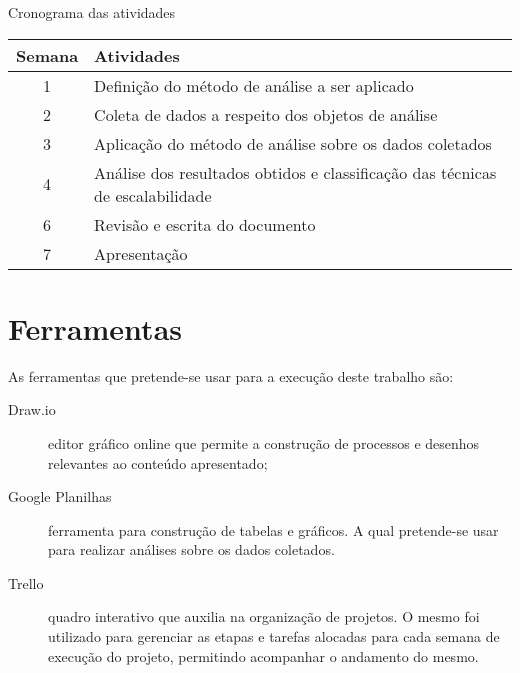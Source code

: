 \begin{quadro}
    \caption{Cronograma das atividades\label{quad:Cronograma}}
    \begin{tabular}{ | c | l | }
    \hline
    \textbf{Semana} &
        \textbf{Atividades} \\ \hline
        1 & Definição do método de análise a ser aplicado \\ \hline
        2 & Coleta de dados a respeito dos objetos de análise \\ \hline
        3 & Aplicação do método de análise sobre os dados coletados \\ \hline
        4 & Análise dos resultados obtidos e classificação das técnicas de escalabilidade \\ \hline
        6 & Revisão e escrita do documento \\ \hline
        7 & Apresentação \\ \hline
    \end{tabular}
\end{quadro}

\section{Ferramentas}

As ferramentas que pretende-se usar para a execução deste trabalho são:

\begin{description}
    \item[Draw.io] editor gráfico online que permite a construção de processos e
    desenhos relevantes ao conteúdo apresentado;
    \item[Google Planilhas] ferramenta para construção de tabelas e gráficos.
    A qual pretende-se usar para realizar análises sobre os dados coletados.
    \item[Trello] quadro interativo que auxilia na organização de projetos. O mesmo foi utilizado
        para gerenciar as etapas e tarefas alocadas para cada semana de execução do projeto,
        permitindo acompanhar o andamento do mesmo.
\end{description}

